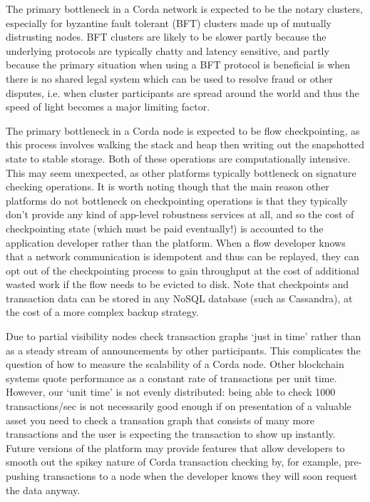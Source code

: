 \documentclass{article}
\begin{document}
The primary bottleneck in a Corda network is expected to be the notary clusters, especially for byzantine fault
tolerant (BFT) clusters made up of mutually distrusting nodes. BFT clusters are likely to be slower partly because the
underlying protocols are typically chatty and latency sensitive, and partly because the primary situation when
using a BFT protocol is beneficial is when there is no shared legal system which can be used to resolve fraud or
other disputes, i.e. when cluster participants are spread around the world and thus the speed of light becomes
a major limiting factor.

The primary bottleneck in a Corda node is expected to be flow checkpointing, as this process involves walking the
stack and heap then writing out the snapshotted state to stable storage. Both of these operations are computationally
intensive. This may seem unexpected, as other platforms typically bottleneck on signature
checking operations. It is worth noting though that the main reason other platforms do not bottleneck
on checkpointing operations is that they typically don't provide any kind of app-level robustness services
at all, and so the cost of checkpointing state (which must be paid eventually!) is accounted to the application
developer rather than the platform. When a flow developer knows that a network communication is idempotent and
thus can be replayed, they can opt out of the checkpointing process to gain throughput at the cost of additional
wasted work if the flow needs to be evicted to disk. Note that checkpoints and transaction data can be stored in
any NoSQL database (such as Cassandra), at the cost of a more complex backup strategy.


Due to partial visibility nodes check transaction graphs `just in time' rather than as a steady stream of
announcements by other participants. This complicates the question of how to measure the scalability of a Corda
node. Other blockchain systems quote performance as a constant rate of transactions per unit time.
However, our `unit time' is not evenly distributed: being able to check 1000 transactions/sec is not
necessarily good enough if on presentation of a valuable asset you need to check a transation graph that consists
of many more transactions and the user is expecting the transaction to show up instantly. Future versions of
the platform may provide features that allow developers to smooth out the spikey nature of Corda transaction
checking by, for example, pre-pushing transactions to a node when the developer knows they will soon request
the data anyway.
\end{document}
